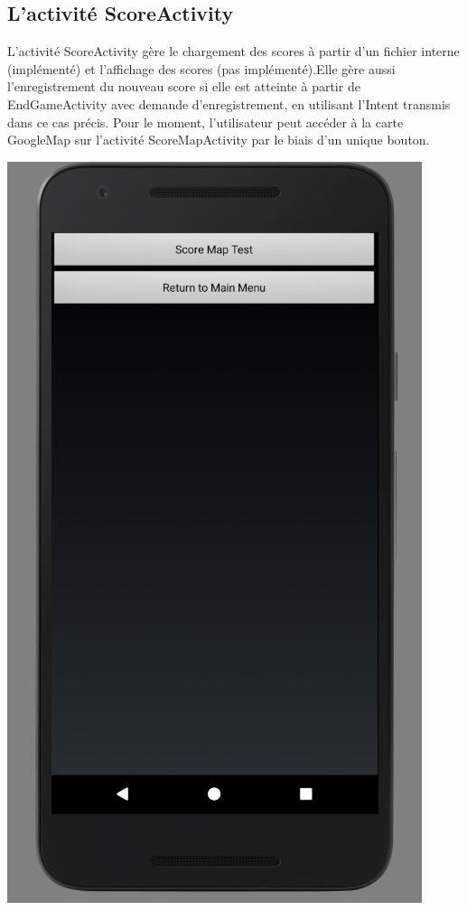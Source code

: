 \documentclass{article}
\begin{document}
\subsection{L'activité ScoreActivity}
L'activité ScoreActivity gère le chargement des scores à partir d'un fichier interne (implémenté) et l'affichage des scores (pas implémenté).Elle gère aussi l'enregistrement du nouveau score si elle est atteinte à partir de EndGameActivity avec demande d'enregistrement, en utilisant l'Intent transmis dans ce cas précis. Pour le moment, l'utilisateur peut accéder à la carte GoogleMap sur l'activité ScoreMapActivity par le biais d'un unique bouton.
\begin{center}
  \includegraphics[scale=0.5]{ScoreActivity.png}
\end{center}
\end{document}
